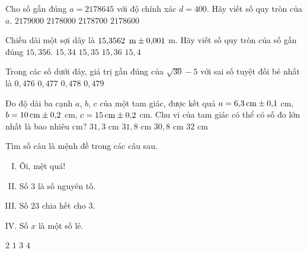 \begin{ex}%
	Cho số gần đúng $a=2178645$ với độ chính xác $d=400$. Hãy viết số quy tròn của $a$.
	\choice
	{\True $2179000$}
	{$2178000$}
	{$2178700$}
	{$2178600$}
\end{ex}
\begin{ex}%
	Chiều dài một sợi dây là $15{,}3562 \text{\, m} \pm 0{,}001$ m. Hãy viết số quy tròn của số gần đúng $15{,}356$.
	\choice
	{$15{,}34$}
	{$15{,}35$}
	{\True $15{,}36$}
	{$15{,}4$}
\end{ex}
\begin{ex}%
	Trong các số dưới đây, giá trị gần đúng của $\sqrt{30}-5$ với sai số tuyệt đối bé nhất là
	\choice
	{$0{,}476$}
	{\True $0{,}477$}
	{$0{,}478$}
	{$0{,}479$}
\end{ex}
\begin{ex}%
	Đo độ dài ba cạnh $a$, $ b $, $c$ của một tam giác, được kết quả $a=6{,}3 \text{\,cm} \pm 0{,}1$ cm, $b=10 \text{\,cm} \pm 0{,}2$ cm, $c=15 \text{\,cm} \pm 0{,}2$ cm. Chu vi của tam giác có thể có số đo lớn nhất là bao nhiêu cm?
	\choice
	{$31{,}3$ cm}
	{\True $31{,}8$ cm}
	{$30{,}8$ cm}
	{$32$ cm}
\end{ex}
\begin{ex}%
	Tìm số câu là mệnh đề trong các câu sau.
	\begin{enumerate}[(I)]
		\item Ôi, mệt quá!
		\item Số $ 3 $ là số nguyên tố.
		\item Số $ 23 $ chia hết cho $ 3 $.
		\item Số $x$ là một số lẻ.
	\end{enumerate}
	\choice
	{\True $2$}
	{$1$}
	{$3$}
	{$4$}
\end{ex}


